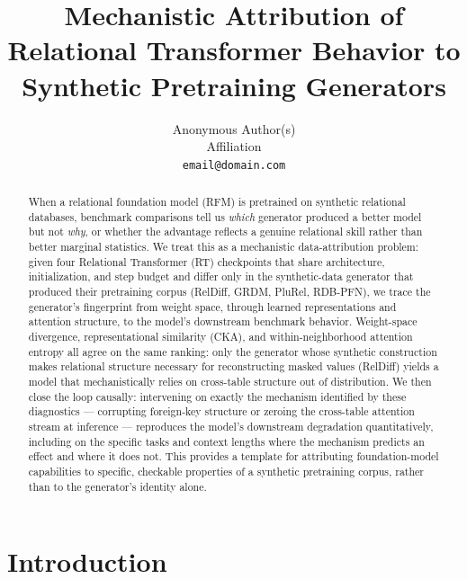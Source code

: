 \documentclass{article}
\title{Mechanistic Attribution of Relational Transformer Behavior to Synthetic Pretraining Generators}
\author{%
  Anonymous Author(s) \\
  Affiliation \\
  \texttt{email@domain.com}
}
\begin{document}
\maketitle

\begin{abstract}
When a relational foundation model (RFM) is pretrained on synthetic relational databases, benchmark comparisons tell us \emph{which} generator produced a better model but not \emph{why}, or whether the advantage reflects a genuine relational skill rather than better marginal statistics. We treat this as a mechanistic data-attribution problem: given four Relational Transformer (RT) checkpoints that share architecture, initialization, and step budget and differ only in the synthetic-data generator that produced their pretraining corpus (RelDiff, GRDM, PluRel, RDB-PFN), we trace the generator's fingerprint from weight space, through learned representations and attention structure, to the model's downstream benchmark behavior. Weight-space divergence, representational similarity (CKA), and within-neighborhood attention entropy all agree on the same ranking: only the generator whose synthetic construction makes relational structure necessary for reconstructing masked values (RelDiff) yields a model that mechanistically relies on cross-table structure out of distribution. We then close the loop causally: intervening on exactly the mechanism identified by these diagnostics --- corrupting foreign-key structure or zeroing the cross-table attention stream at inference --- reproduces the model's downstream degradation quantitatively, including on the specific tasks and context lengths where the mechanism predicts an effect and where it does not. This provides a template for attributing foundation-model capabilities to specific, checkable properties of a synthetic pretraining corpus, rather than to the generator's identity alone.
\end{abstract}

\section{Introduction}
\label{sec:intro}
\end{document}
